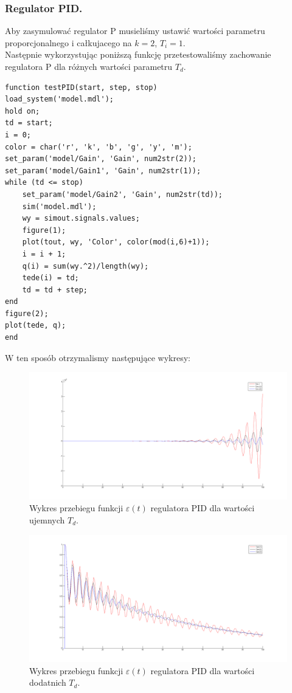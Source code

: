 \documentclass[a4paper,10pt]{article}
\begin{document}
\subsubsection{Regulator PID.}
Aby zasymulować regulator P musieliśmy ustawić wartości parametru proporcjonalnego i całkujacego na $k=2$, $T_{i}=1$. \\
Następnie wykorzystując poniższą funkcję przetestowaliśmy zachowanie regulatora P dla różnych wartości parametru $T_{d}$. \\
\begin{lstlisting}[caption=Funkcja testująca regulator P.]
function testPID(start, step, stop)
load_system('model.mdl');
hold on;
td = start;
i = 0;
color = char('r', 'k', 'b', 'g', 'y', 'm');
set_param('model/Gain', 'Gain', num2str(2));
set_param('model/Gain1', 'Gain', num2str(1));
while (td <= stop)
    set_param('model/Gain2', 'Gain', num2str(td));
    sim('model.mdl');
    wy = simout.signals.values;
    figure(1);
    plot(tout, wy, 'Color', color(mod(i,6)+1));
    i = i + 1;
    q(i) = sum(wy.^2)/length(wy);
    tede(i) = td;
    td = td + step;
end
figure(2);
plot(tede, q);
end
\end{lstlisting}
W ten sposób otrzymalismy następujące wykresy: \\
\begin{figure}[!h]
    \centering
	\includegraphics[width=140mm]{CW2-regulatorPID-eu.png}
	\caption{Wykres przebiegu funkcji $\varepsilon(t)$ regulatora PID dla wartości ujemnych $T_{d}$.}
    \label{fig:regulatorPIDeu}
\end{figure}
\begin{figure}[!h]
    \centering
	\includegraphics[width=140mm]{CW2-regulatorPID-ed.png}
	\caption{Wykres przebiegu funkcji $\varepsilon(t)$ regulatora PID dla wartości dodatnich $T_{d}$.}
    \label{fig:regulatorPIDed}
\end{figure}
\end{document}
